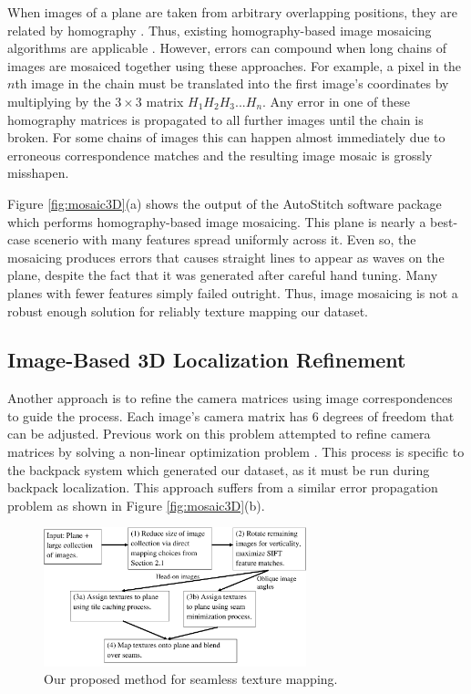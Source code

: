 \documentclass[10pt,twocolumn,letterpaper]{article}
\begin{document}
When images of a plane are taken from arbitrary overlapping positions,
they are related by homography \cite{hz}. Thus, existing
homography-based image mosaicing algorithms are applicable
\cite{brown2007automatic}. However, errors can compound when long
chains of images are mosaiced together using these approaches. For
example, a pixel in the $n$th image in the chain must be translated
into the first image's coordinates by multiplying by the $3\times3$
matrix $H_1 H_2 H_3 ... H_n$. Any error in one of these homography
matrices is propagated to all further images until the chain is
broken. For some chains of images this can happen almost immediately
due to erroneous correspondence matches and the resulting image mosaic
is grossly misshapen.

Figure \ref{fig:mosaic3D}(a) shows the output of the AutoStitch software
package which performs homography-based image mosaicing. This plane is
nearly a best-case scenerio with many features spread uniformly across
it. Even so, the mosaicing produces errors that causes straight lines
to appear as waves on the plane, despite the fact that it was
generated after careful hand tuning. Many planes with fewer features
simply failed outright. Thus, image mosaicing is not a robust enough
solution for reliably texture mapping our dataset.

\subsection{Image-Based 3D Localization Refinement}
\label{sec:imageBased3DRefinement}

Another approach is to refine the camera matrices using image
correspondences to guide the process. Each image's camera matrix has 6
degrees of freedom that can be adjusted. Previous work on this problem
attempted to refine camera matrices by solving a non-linear
optimization problem \cite{liu2010indoor}. This process is specific to
the backpack system which generated our dataset, as it must be run
during backpack localization\cite{liu2010indoor,
  chen2010indoor}. This approach suffers from a similar
error propagation problem as shown in Figure \ref{fig:mosaic3D}(b).


\begin{figure}
  \centering
  \includegraphics[width=3in]{pipeline.pdf}
  \caption{Our proposed method for seamless texture mapping.}
  \label{fig:pipeline}
\end{figure}
\end{document}
